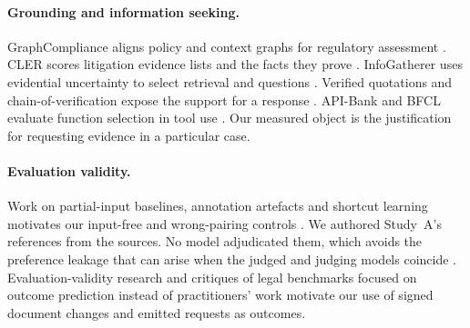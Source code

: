 \paragraph{Grounding and information seeking.}
GraphCompliance aligns policy and context graphs for regulatory assessment
\citep{chung2025graphcompliance}. CLER scores litigation evidence lists and
the facts they prove \citep{bi2026cler}. InfoGatherer uses evidential
uncertainty to select retrieval and questions
\citep{taranukhin2026infogatherer}. Verified quotations and
chain-of-verification expose the support for a response
\citep{menick2022verifiedquotes,dhuliawala2024chain}. API-Bank and BFCL
evaluate function selection in tool use \citep{li2023apibank,patil2025bfcl}.
Our measured object is the justification for requesting evidence in a
particular case.

\paragraph{Evaluation validity.}
Work on partial-input baselines, annotation artefacts and shortcut learning
motivates our input-free and wrong-pairing controls
\citep{kaushik2018reading,poliak2018hypothesis,gururangan2018artifacts,mccoy2019hans,sugawara2018easier,geirhos2020shortcut,bowman2021benchmarking,yuan2024shortcut}.
We authored Study~A's references from the sources. No model adjudicated them,
which avoids the preference leakage that can arise when the judged and
judging models coincide \citep{li2026preference}. Evaluation-validity research
\citep{thomas2026validity} and critiques of legal benchmarks focused on
outcome prediction instead of practitioners' work
\citep{medvedeva2023right,lou2026lawyering} motivate our use of signed
document changes and emitted requests as outcomes.
